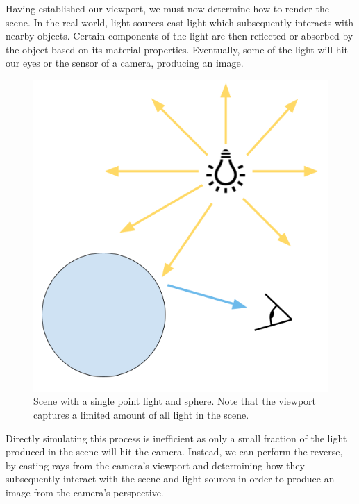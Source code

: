 \noindent
Having established our viewport, we must now determine how to render the scene. In the real world, light sources cast light which subsequently interacts with nearby objects. Certain components of the light are then reflected or absorbed by the object based on its material properties. Eventually, some of the light will hit our eyes or the sensor of a camera, producing an image.
\begin{figure}[H]
    \centering
    \includegraphics[scale=0.3]{figures/ForwardRT.png}
    \caption{Scene with a single point light and sphere. Note that the viewport captures a limited amount of all light in the scene.}
    \label{fig:forward_rt}
\end{figure}

\noindent
Directly simulating this process is inefficient as only a small fraction of the light produced in the scene will hit the camera. Instead, we can perform the reverse, by casting rays from the camera's viewport and determining how they subsequently interact with the scene and light sources in order to produce an image from the camera's perspective.